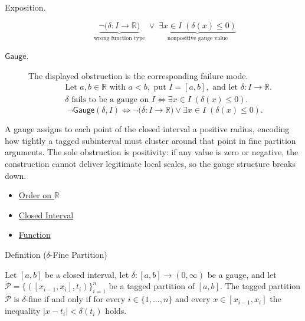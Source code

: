 \begin{remark*}
\begin{description}
  \item[Exposition.]
\[
\underbrace{\neg\bigl(\delta:I\to\mathbb{R}\bigr)}_{\text{wrong function type}}
\;\lor\;
\underbrace{\exists x\in I\;(\delta(x)\le 0)}_{\text{nonpositive gauge value}}
\]


  \item[\(\mathsf{Gauge}.\)]
  The displayed obstruction is the corresponding failure mode.
  \[
\begin{aligned}
&\text{Let } a,b\in\mathbb{R} \text{ with } a<b, \text{ put } I=[a,b], \text{ and let } \delta:I\to\mathbb{R}.\\
&\delta \text{ fails to be a gauge on } I \Longleftrightarrow \exists x\in I\;(\delta(x)\le 0).
\end{aligned}
  \]
  \[
\neg\mathsf{Gauge}(\delta,I)
\Longleftrightarrow
\neg\bigl(\delta:I\to\mathbb{R}\bigr)
\lor
\exists x\in I\;(\delta(x)\le 0).
  \]
\end{description}
\end{remark*}

\begin{remark*}[Interpretation]
A gauge assigns to each point of the closed interval a positive radius, encoding how tightly a tagged subinterval must cluster around that point in fine partition arguments. The sole obstruction is positivity: if any value is zero or negative, the construction cannot deliver legitimate local scales, so the gauge structure breaks down.
\end{remark*}

\begin{dependencies}
\begin{itemize}
  \item \hyperref[def:order-on-r]{Order on $\mathbb{R}$}
  \item \hyperref[def:closed-interval]{Closed Interval}
  \item \hyperref[def:function]{Function}
\end{itemize}
\end{dependencies}

\begin{definitionbox}{Definition ($\delta$-Fine Partition)}
\begin{definition}
\label{def:delta-fine-partition}
Let $[a,b]$ be a closed interval, let $\delta:[a,b]\to(0,\infty)$ be a gauge, and let $\dot{\mathcal{P}}=\{([x_{i-1},x_i],t_i)\}_{i=1}^n$ be a tagged partition of $[a,b]$. The tagged partition $\dot{\mathcal{P}}$ is $\delta$-fine if and only if for every $i \in \{1,\dots,n\}$ and every $x \in [x_{i-1},x_i]$ the inequality $|x-t_i|<\delta(t_i)$ holds.
\end{definition}
\end{definitionbox}

